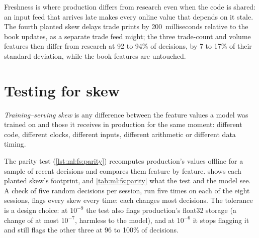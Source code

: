 Freshness is where production differs from research even when the code is shared: an input feed that arrives late makes every
online value that depends on it stale. The fourth planted skew delays trade prints by 200~milliseconds relative to the book
updates, as a separate trade feed might; the three trade-count and volume features then differ from research at 92 to 94\% of
decisions, by 7 to 17\% of their standard deviation, while the book features are untouched.

\section{Testing for skew}

\begin{definition}\label{def:ml:data-and-feature-stores:skew}
\emph{Training--serving skew} is any difference between the feature values a model was trained
on and those it receives in production for the same moment: different code, different clocks, different inputs, different
arithmetic or different data timing.
\end{definition}

The parity test (\cref{lst:ml:fs:parity}) recomputes production's values offline for a sample of recent decisions and compares
them feature by feature.  shows each planted skew's footprint, and \cref{tab:ml:fs:parity} what the test
and the model see. A check of five random decisions per session, run five times on each of the eight sessions, flags every
skew every time: each changes most decisions. The tolerance is a design choice: at $10^{-9}$ the test also flags production's
float32 storage (a change of at most $10^{-7}$, harmless to the model), and at $10^{-6}$ it stops flagging it and still
flags the other three at 96 to 100\% of decisions.

